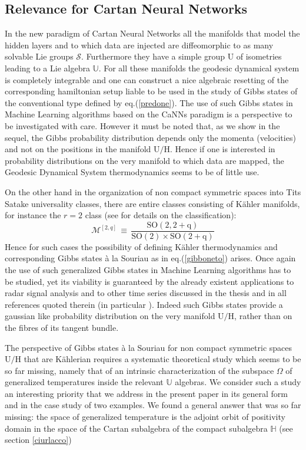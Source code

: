 \documentclass[10pt,a4paper]{article}
\begin{document}
\subsection{Relevance for Cartan Neural Networks}
\label{rilevancio}
In the new paradigm of Cartan Neural Networks all the manifolds that model the hidden layers and to which data are injected are diffeomorphic to as many solvable Lie groups $\mathcal{S}$. Furthermore they have a simple group $\mathrm{U}$ of isometries leading to a Lie algebra $\mathbb{U}$. For all these manifolds the geodesic dynamical system is completely integrable and one can construct a nice algebraic resetting of the corresponding hamiltonian setup liable to be used in the study of Gibbs states of the conventional type defined by eq.(\ref{predone}). The use of such Gibbs states in Machine Learning algorithms based on the CaNNs paradigm is a perspective to be investigated with care. However it must be noted that, as we show in the sequel, the Gibbs probability distribution depends only the momenta (velocities) and not on the positions in the manifold $\mathrm{U/H}$. Hence if one is interested in probability distributions on the very manifold to which data are mapped, the Geodesic Dynamical System thermodynamics seems to be of little use.
\par
On the other hand in the organization of non compact symmetric spaces into Tits Satake universality classes, there are entire
classes consisting of K\"ahler manifolds, for instance the $r=2$ class (see \cite{pgtstheory} for details on the classification):
\begin{equation}\label{r2class}
  \mathcal{M}^{[2,q]} \, \equiv \, \frac{\mathrm{SO(2,2+q)}}{\mathrm{SO(2)}\times \mathrm{SO(2+q)}}
\end{equation}
Hence for such cases the possibility of defining K\"ahler thermodynamics and corresponding Gibbs states
 {\`a} la Souriau as in eq.(\ref{gibboneto}) arises. Once again the use of such generalized Gibbs states in Machine Learning algorithms has to be studied, yet its viability  is  guaranteed by the already existent applications to radar signal analysis and to other time series discussed in the thesis \cite{capanna} and in all references quoted therein (in particular \cite{radarone}). Indeed such Gibbs states provide a gaussian like probability distribution on the very manifold $\mathrm{U/H}$, rather than on the fibres of its tangent bundle.
\par
The perspective of Gibbs states {\`a} la Souriau for non compact symmetric spaces $\mathrm{U/H}$ that are K\"ahlerian requires a systematic theoretical study which seems to be so far missing, namely that of an intrinsic characterization of the subspace $\Omega$ of generalized temperatures inside the relevant $\mathbb{U}$ algebras. We consider such a study an interesting priority that we address in the present paper in its general form and in the case study of two examples. We found a general answer that was so far missing: the space of generalized temperature is the adjoint orbit of positivity domain in the space of the Cartan subalgebra of the compact subalgebra $\mathbb{H}$ (see section \ref{ciurlacco})
\end{document}
